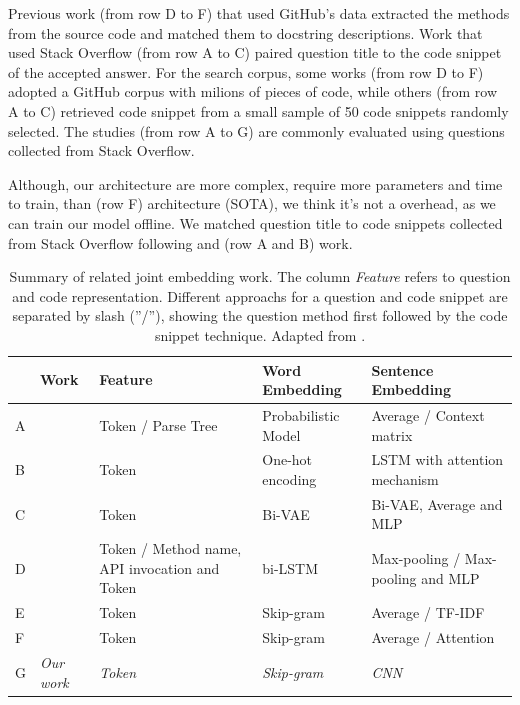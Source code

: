 \documentclass[sigconf]{acmart}
\begin{document}
Previous work (from row D to F) that used GitHub's data extracted the methods from the source code and matched them to docstring descriptions. Work that used Stack Overflow  (from row A to C) paired question title to the code snippet of the accepted answer. For the search corpus, some works (from row D to F) adopted a GitHub corpus with milions of pieces of code, while others  (from row A to C) retrieved code snippet from a small sample of 50 code snippets randomly selected. The studies (from row A to G) are commonly evaluated using questions collected from Stack Overflow. 

Although, our architecture are more complex, require more parameters and time to train, than \citet{cambronero-deep-code-search-2019} (row F) architecture (SOTA), we think it's not a overhead, as we can train our model offline. We matched question title to code snippets collected from Stack Overflow following \citet{Allamanis-bimodal-source-code-natural-language:2015} and \citet{iyer-etal-2016-summarizing} (row A and B) work. 


\begin{table}[t]
\centering
\begin{tabular}{ p{0.1cm} p{2cm} p{1.5cm} p{1.5cm} p{1.5cm} }
 \hline
 & \textbf{Work} & \textbf{Feature} & \textbf{Word Embedding} & \textbf{Sentence Embedding} \\
 \hline
A & \citet{Allamanis-bimodal-source-code-natural-language:2015} & Token / Parse Tree & Probabilistic Model & Average / Context matrix  \\

B &\citet{iyer-etal-2016-summarizing} & Token & One-hot encoding & LSTM with attention mechanism  \\

C &\citet{Chen-bi-variational-autoencoder:2018} & Token & Bi-VAE & Bi-VAE, Average and MLP  \\

D &\citet{Gu-deep-code-search:2018} & Token / Method name, API invocation and Token & bi-LSTM & Max-pooling / Max-pooling and MLP   \\

E &\citet{Sachdev-neural-code-search:2018} & Token & Skip-gram & Average / TF-IDF   \\

F &\citet{cambronero-deep-code-search-2019} & Token & Skip-gram & Average / Attention   \\

G & \textit{Our work} & \textit{Token} & \textit{Skip-gram} & \textit{CNN}   \\

 \hline
\end{tabular}
\caption{Summary of related joint embedding work. The column \emph{Feature} refers to question and code representation. Different approachs for a question and code snippet are separated by slash (''/''), showing the question method first followed by the code snippet technique. Adapted from \cite{yan-benchmark-code-search-information-retrieval-deep-learning:2020}.}
\label{table:summary-joint-embedding-related-work}
\end{table}
\end{document}
